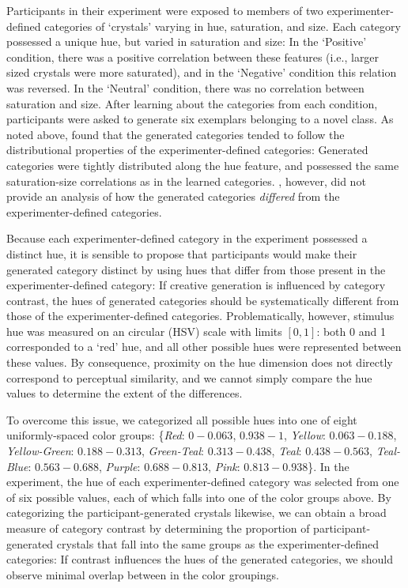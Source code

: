 \documentclass[12pt]{article}
\newcommand\nbcnote[1]{\todo[inline, backgroundcolor = yellow]{\textbf{NBC}: #1}}
\begin{document}
\begin{flushleft}
Participants in their experiment were exposed to members of two experimenter-defined categories of `crystals' varying in hue, saturation, and size. Each category possessed a unique hue, but varied in saturation and size: In the `Positive' condition, there was a positive correlation between these features (i.e., larger sized crystals were more saturated), and in the `Negative' condition this relation was reversed. In the `Neutral' condition, there was no correlation between saturation and size. After learning about the categories from each condition, participants were asked to generate six exemplars belonging to a novel class. As noted above, \cite{jern2013probabilistic} found that the generated categories tended to follow the distributional properties of the experimenter-defined categories: Generated categories were tightly distributed along the hue feature, and possessed the same saturation-size correlations as in the learned categories. \cite{jern2013probabilistic}, however, did not provide an analysis of how the generated categories \textit{differed} from the experimenter-defined categories. 

Because each experimenter-defined category in the \cite{jern2013probabilistic} experiment possessed a distinct hue, it is sensible to propose that participants would make their generated category distinct by using hues that differ from those present in the experimenter-defined category: If creative generation is influenced by category contrast, the hues of generated categories should be systematically different from those of the experimenter-defined categories. Problematically, however, stimulus hue was measured on an circular (HSV) scale with limits $[0,1]$: both 0 and 1 corresponded to a `red' hue, and all other possible hues were represented between these values. By consequence, proximity on the hue dimension does not directly correspond to perceptual similarity, and we cannot simply compare the hue values to determine the extent of the differences.
\nbcnote{Maybe add a cite for proximity-similarity distinction?} 

To overcome this issue, we categorized all possible hues into one of eight uniformly-spaced color groups: \{\textit{Red}: $0-0.063$, $0.938-1$, \textit{Yellow}: $0.063-0.188$, \textit{Yellow-Green}: $0.188-0.313$, \textit{Green-Teal}: $0.313-0.438$, \textit{Teal}: $0.438-0.563$, \textit{Teal-Blue}: $0.563-0.688$, \textit{Purple}: $0.688-0.813$, \textit{Pink}: $0.813-0.938$\}. In the \cite{jern2013probabilistic} experiment, the hue of each experimenter-defined category was selected from one of six possible values, each of which falls into one of the color groups above. By categorizing the participant-generated crystals likewise, we can obtain a broad measure of category contrast by determining the proportion of participant-generated crystals that fall into the same groups as the experimenter-defined categories: If contrast influences the hues of the generated categories, we should observe minimal overlap between in the color groupings.




\end{flushleft}
\end{document}
